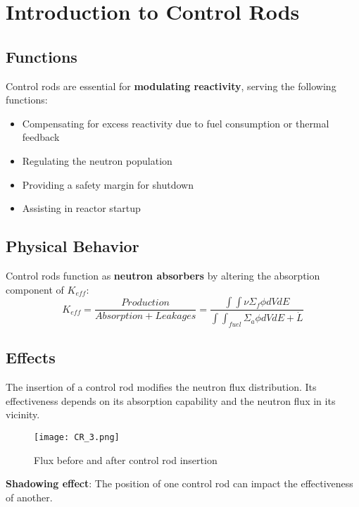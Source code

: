 \section{Introduction to Control Rods}

\subsection{Functions}
Control rods are essential for \textbf{modulating reactivity}, serving the following functions:
\begin{itemize}
    \item Compensating for excess reactivity due to fuel consumption or thermal feedback
    \item Regulating the neutron population
    \item Providing a safety margin for shutdown
    \item Assisting in reactor startup
\end{itemize}

\subsection{Physical Behavior}
Control rods function as \textbf{neutron absorbers} by altering the absorption component of $K_{eff}$:
\begin{equation}
    K_{eff} = \frac{Production}{Absorption + Leakages} = \frac{\int \int \nu \Sigma_f \phi dV dE}{\int \int _{fuel} \Sigma_a \phi dV dE + \dot{L}}
\end{equation}

\subsection{Effects}
The insertion of a control rod modifies the neutron flux distribution. Its effectiveness depends on its absorption capability and the neutron flux in its vicinity.

\begin{figure}[h]
    \centering
    \texttt{[image: CR\_3.png]}
    \caption{Flux before and after control rod insertion}
\end{figure}

\textbf{Shadowing effect}: The position of one control rod can impact the effectiveness of another.

